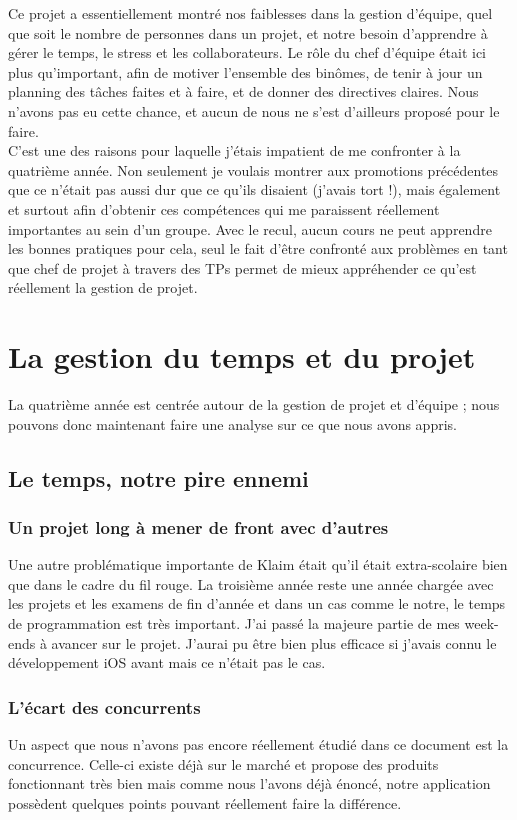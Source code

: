 \documentclass{article}
\begin{document}
		Ce projet a essentiellement montré nos faiblesses dans la gestion d'équipe, quel que soit le nombre de personnes dans un projet, et notre besoin d'apprendre à gérer le temps, le stress et les collaborateurs. Le rôle du chef d'équipe était ici plus qu'important, afin de motiver l'ensemble des binômes, de tenir à jour un planning des tâches faites et à faire, et de donner des directives claires. Nous n'avons pas eu cette chance, et aucun de nous ne s'est d'ailleurs proposé pour le faire. \\
		
		C'est une des raisons pour laquelle j'étais impatient de me confronter à la quatrième année. Non seulement je voulais montrer aux promotions précédentes que ce n'était pas aussi dur que ce qu'ils disaient (j'avais tort !), mais également et surtout afin d'obtenir ces compétences qui me paraissent réellement importantes au sein d'un groupe. Avec le recul, aucun cours ne peut apprendre les bonnes pratiques pour cela, seul le fait d'être confronté aux problèmes en tant que chef de projet à travers des TPs permet de mieux appréhender ce qu'est réellement la gestion de projet.


\section{La gestion du temps et du projet}
		La quatrième année est centrée autour de la gestion de projet et d'équipe ; nous pouvons donc maintenant faire une analyse sur ce que nous avons appris.
		
	\subsection{Le temps, notre pire ennemi}
		\subsubsection{Un projet long à mener de front avec d'autres}
		Une autre problématique importante de Klaim était qu'il était extra-scolaire bien que dans le cadre du fil rouge. La troisième année reste une année chargée avec les projets et les examens de fin d'année et dans un cas comme le notre, le temps de programmation est très important. J'ai passé la majeure partie de mes week-ends à avancer sur le projet. J'aurai pu être bien plus efficace si j'avais connu le développement iOS avant mais ce n'était pas le cas.

		\subsubsection{L'écart des concurrents}
		Un aspect que nous n'avons pas encore réellement étudié dans ce document est la concurrence. Celle-ci existe déjà sur le marché et propose des produits fonctionnant très bien mais comme nous l'avons déjà énoncé, notre application possèdent quelques points pouvant réellement faire la différence.\\
		
\end{document}
